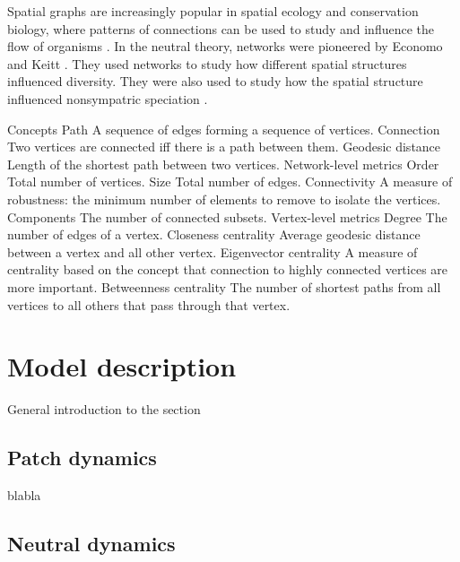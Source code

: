 \documentclass[letterpaper,twocolumn,showkeys]{revtex4-1}
\begin{document}
Spatial graphs are increasingly popular in spatial ecology and conservation
biology, where patterns of connections can be used to study and influence the
flow of organisms \cite{min07,fal07,min08,gar08,urb09,dal10}. In the neutral 
theory, networks were pioneered by Economo and Keitt \cite{eco08, eco10}. 
They used networks to study how different spatial structures influenced 
diversity. They were also used to study how the spatial structure influenced 
nonsympatric speciation \cite{des12,des12b}.

Concepts
  Path                    A sequence of edges forming a sequence of vertices.
  Connection              Two vertices are connected iff there is a path between them.
  Geodesic distance       Length of the shortest path between two vertices.
Network-level metrics
  Order                   Total number of vertices.
  Size                    Total number of edges.
  Connectivity            A measure of robustness: the minimum number of elements to remove
                          to isolate the vertices.
  Components              The number of connected subsets.
Vertex-level metrics
  Degree                  The number of edges of a vertex.
  Closeness centrality    Average geodesic distance between a vertex and all other vertex.
  Eigenvector centrality  A measure of centrality based on the concept that connection to
                          highly connected vertices are more important.
  Betweenness centrality  The number of shortest paths from all vertices to all others that
                          pass through that vertex.

\section{Model description}

General introduction to the section

\subsection{Patch dynamics}
blabla

\subsection{Neutral dynamics}
\end{document}
